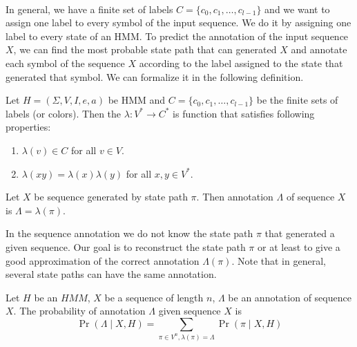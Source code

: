 \paragraph{} In general,
we have a finite set of labels $C=\{c_0,c_1,\dots,c_{l-1}\}$ and we want to
assign one label to every symbol of the input sequence. We do it by assigning
one label to every state of an HMM.
To predict the annotation of the input sequence $X$, we can  find the
most probable state path that can generated $X$ and  annotate each symbol of
the sequence $X$ according to the label assigned to the state that generated that
symbol. We can formalize it in the following definition.

\begin{definition}\label{DEFINITION:ANNOTATION}
Let $H=(\Sigma,V,I,e,a)$ be HMM and $C=\{c_0,c_1,\dots,c_{l-1}\}$ be the finite
sets of labels (or colors). Then the  
$\lambda: V^*\to C^*$ is function that satisfies following properties:
\begin{enumerate}
\item $\lambda(v)\in C$ for all $v\in V$.
\item $\lambda(xy) = \lambda(x)\lambda(y)$ for all $x,y\in V^*$.
\end{enumerate}

Let $X$ be sequence generated by state path $\pi$. Then annotation
$\Lambda$ of sequence $X$ is $\Lambda = \lambda(\pi)$.
\end{definition}

In the sequence annotation we do not know the state path $\pi$ that generated a given
sequence. Our goal is to reconstruct the state path $\pi$ or at least to give a good
approximation of the correct annotation $\Lambda(\pi)$. Note that in general, several state
paths can have the same annotation.


\begin{definition}
Let $H$ be an $HMM$, $X$ be a sequence of length $n$, $\Lambda$ be an annotation of sequence
$X$. The probability of annotation $\Lambda$ given sequence $X$ is 
\begin{equation}
\Pr\left(\Lambda\mid X,H\right)=\sum_{\pi \in V^n,\lambda(\pi) =
\Lambda}\Pr\left(\pi\mid X,H \right)\label{DEF:ANNOTATION:PROBABILITY}
\end{equation}
\end{definition}

